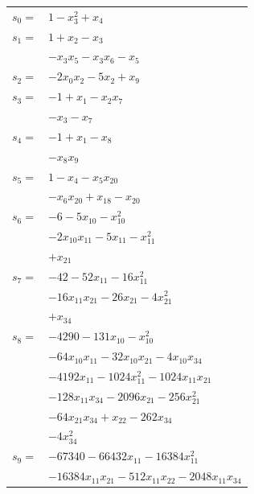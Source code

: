 \begingroup
\small
\setlength{\tabcolsep}{2pt}
\setlength{\LTleft}{0pt}
\begin{longtable}{@{}r@{\;}l@{}}
\(s_{0}=\) & \(\displaystyle 1 -x_{3}^{2} +x_{4}\) \\[3pt]
\(s_{1}=\) & \(\displaystyle 1 +x_{2} -x_{3}\) \\
 & \(\displaystyle -x_{3}x_{5} -x_{3}x_{6} -x_{5}\) \\[3pt]
\(s_{2}=\) & \(\displaystyle -2x_{0}x_{2} -5x_{2} +x_{9}\) \\[3pt]
\(s_{3}=\) & \(\displaystyle -1 +x_{1} -x_{2}x_{7}\) \\
 & \(\displaystyle -x_{3} -x_{7}\) \\[3pt]
\(s_{4}=\) & \(\displaystyle -1 +x_{1} -x_{8}\) \\
 & \(\displaystyle -x_{8}x_{9}\) \\[3pt]
\(s_{5}=\) & \(\displaystyle 1 -x_{4} -x_{5}x_{20}\) \\
 & \(\displaystyle -x_{6}x_{20} +x_{18} -x_{20}\) \\[3pt]
\(s_{6}=\) & \(\displaystyle -6 -5x_{10} -x_{10}^{2}\) \\
 & \(\displaystyle -2x_{10}x_{11} -5x_{11} -x_{11}^{2}\) \\
 & \(\displaystyle +x_{21}\) \\[3pt]
\(s_{7}=\) & \(\displaystyle -42 -52x_{11} -16x_{11}^{2}\) \\
 & \(\displaystyle -16x_{11}x_{21} -26x_{21} -4x_{21}^{2}\) \\
 & \(\displaystyle +x_{34}\) \\[3pt]
\(s_{8}=\) & \(\displaystyle -4290 -131x_{10} -x_{10}^{2}\) \\
 & \(\displaystyle -64x_{10}x_{11} -32x_{10}x_{21} -4x_{10}x_{34}\) \\
 & \(\displaystyle -4192x_{11} -1024x_{11}^{2} -1024x_{11}x_{21}\) \\
 & \(\displaystyle -128x_{11}x_{34} -2096x_{21} -256x_{21}^{2}\) \\
 & \(\displaystyle -64x_{21}x_{34} +x_{22} -262x_{34}\) \\
 & \(\displaystyle -4x_{34}^{2}\) \\[3pt]
\(s_{9}=\) & \(\displaystyle -67340 -66432x_{11} -16384x_{11}^{2}\) \\
 & \(\displaystyle -16384x_{11}x_{21} -512x_{11}x_{22} -2048x_{11}x_{34}\) \\

\end{longtable}
